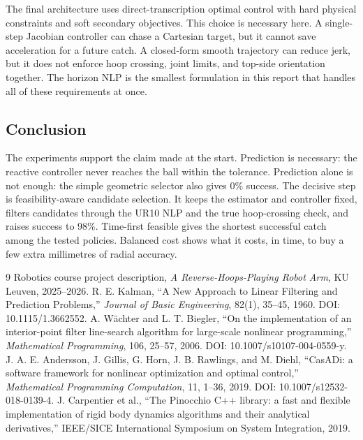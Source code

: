 \documentclass[a4paper,10pt]{article}
\begin{document}
The final architecture uses direct-transcription optimal control with hard physical constraints and soft secondary objectives. This choice is necessary here. A single-step Jacobian controller can chase a Cartesian target, but it cannot save acceleration for a future catch. A closed-form smooth trajectory can reduce jerk, but it does not enforce hoop crossing, joint limits, and top-side orientation together. The horizon NLP is the smallest formulation in this report that handles all of these requirements at once.

\subsection*{Conclusion}

The experiments support the claim made at the start. Prediction is necessary: the reactive controller never reaches the ball within the tolerance. Prediction alone is not enough: the simple geometric selector also gives 0\% success. The decisive step is feasibility-aware candidate selection. It keeps the estimator and controller fixed, filters candidates through the UR10 NLP and the true hoop-crossing check, and raises success to 98\%. Time-first feasible gives the shortest successful catch among the tested policies. Balanced cost shows what it costs, in time, to buy a few extra millimetres of radial accuracy.

\clearpage
\begin{thebibliography}{9}
     Robotics course project description, \emph{A Reverse-Hoops-Playing Robot Arm}, KU Leuven, 2025--2026.
     R. E. Kalman, ``A New Approach to Linear Filtering and Prediction Problems,'' \emph{Journal of Basic Engineering}, 82(1), 35--45, 1960. DOI: 10.1115/1.3662552.
     A. W\"achter and L. T. Biegler, ``On the implementation of an interior-point filter line-search algorithm for large-scale nonlinear programming,'' \emph{Mathematical Programming}, 106, 25--57, 2006. DOI: 10.1007/s10107-004-0559-y.
     J. A. E. Andersson, J. Gillis, G. Horn, J. B. Rawlings, and M. Diehl, ``CasADi: a software framework for nonlinear optimization and optimal control,'' \emph{Mathematical Programming Computation}, 11, 1--36, 2019. DOI: 10.1007/s12532-018-0139-4.
     J. Carpentier et al., ``The Pinocchio C++ library: a fast and flexible implementation of rigid body dynamics algorithms and their analytical derivatives,'' IEEE/SICE International Symposium on System Integration, 2019.
\end{thebibliography}
\end{document}

